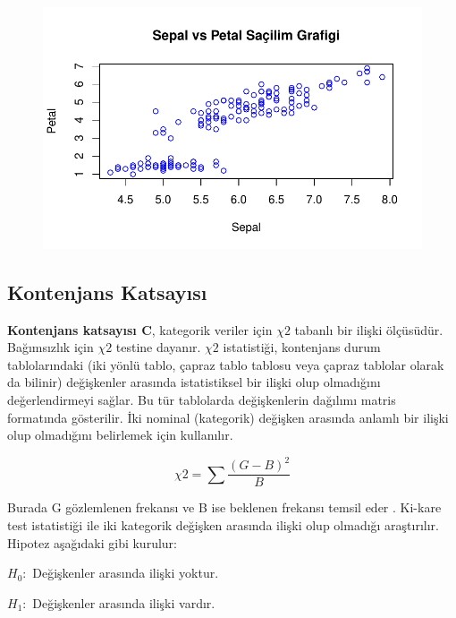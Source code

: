 \documentclass[
  letterpaper,
  DIV=11,
  numbers=noendperiod]{scrreprt}
\begin{document}
\begin{figure}[H]

{\centering \includegraphics{statistics_files/figure-pdf/unnamed-chunk-12-1.pdf}

}

\end{figure}

\hypertarget{kontenjans-katsayux131sux131}{%
\subsection*{Kontenjans Katsayısı}\label{kontenjans-katsayux131sux131}}

\textbf{Kontenjans katsayısı C}, kategorik veriler için \(\chi 2\)
tabanlı bir ilişki ölçüsüdür. Bağımsızlık için \(\chi 2\) testine
dayanır. \(\chi 2\) istatistiği, kontenjans durum tablolarındaki (iki
yönlü tablo, çapraz tablo tablosu veya çapraz tablolar olarak da
bilinir) değişkenler arasında istatistiksel bir ilişki olup olmadığını
değerlendirmeyi sağlar. Bu tür tablolarda değişkenlerin dağılımı matris
formatında gösterilir. İki nominal (kategorik) değişken arasında anlamlı
bir ilişki olup olmadığını belirlemek için kullanılır.

\[ \chi 2=\sum\frac{(G-B)^2}{B} \]

Burada G gözlemlenen frekansı ve B ise beklenen frekansı temsil eder .
Ki-kare test istatistiği ile iki kategorik değişken arasında ilişki olup
olmadığı araştırılır. Hipotez aşağıdaki gibi kurulur:

\(H_0:\) Değişkenler arasında ilişki yoktur.

\(H_1:\) Değişkenler arasında ilişki vardır.
\end{document}
